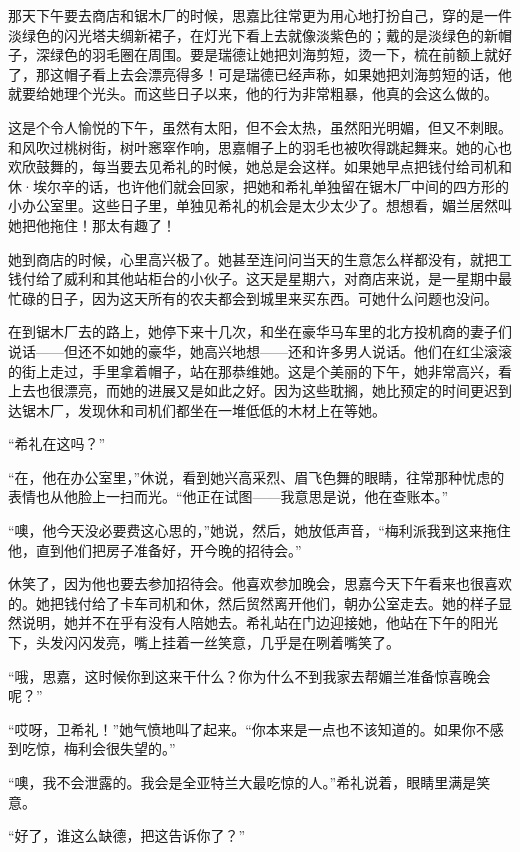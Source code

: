 \par 那天下午要去商店和锯木厂的时候，思嘉比往常更为用心地打扮自己，穿的是一件淡绿色的闪光塔夫绸新裙子，在灯光下看上去就像淡紫色的；戴的是淡绿色的新帽子，深绿色的羽毛圈在周围。要是瑞德让她把刘海剪短，烫一下，梳在前额上就好了，那这帽子看上去会漂亮得多！可是瑞德已经声称，如果她把刘海剪短的话，他就要给她理个光头。而这些日子以来，他的行为非常粗暴，他真的会这么做的。
\par 这是个令人愉悦的下午，虽然有太阳，但不会太热，虽然阳光明媚，但又不刺眼。和风吹过桃树街，树叶窸窣作响，思嘉帽子上的羽毛也被吹得跳起舞来。她的心也欢欣鼓舞的，每当要去见希礼的时候，她总是会这样。如果她早点把钱付给司机和休·埃尔辛的话，也许他们就会回家，把她和希礼单独留在锯木厂中间的四方形的小办公室里。这些日子里，单独见希礼的机会是太少太少了。想想看，媚兰居然叫她把他拖住！那太有趣了！
\par 她到商店的时候，心里高兴极了。她甚至连问问当天的生意怎么样都没有，就把工钱付给了威利和其他站柜台的小伙子。这天是星期六，对商店来说，是一星期中最忙碌的日子，因为这天所有的农夫都会到城里来买东西。可她什么问题也没问。
\par 在到锯木厂去的路上，她停下来十几次，和坐在豪华马车里的北方投机商的妻子们说话——但还不如她的豪华，她高兴地想——还和许多男人说话。他们在红尘滚滚的街上走过，手里拿着帽子，站在那恭维她。这是个美丽的下午，她非常高兴，看上去也很漂亮，而她的进展又是如此之好。因为这些耽搁，她比预定的时间更迟到达锯木厂，发现休和司机们都坐在一堆低低的木材上在等她。
\par “希礼在这吗？”
\par “在，他在办公室里，”休说，看到她兴高采烈、眉飞色舞的眼睛，往常那种忧虑的表情也从他脸上一扫而光。“他正在试图——我意思是说，他在查账本。”
\par “噢，他今天没必要费这心思的，”她说，然后，她放低声音，“梅利派我到这来拖住他，直到他们把房子准备好，开今晚的招待会。”
\par 休笑了，因为他也要去参加招待会。他喜欢参加晚会，思嘉今天下午看来也很喜欢的。她把钱付给了卡车司机和休，然后贸然离开他们，朝办公室走去。她的样子显然说明，她并不在乎有没有人陪她去。希礼站在门边迎接她，他站在下午的阳光下，头发闪闪发亮，嘴上挂着一丝笑意，几乎是在咧着嘴笑了。
\par “哦，思嘉，这时候你到这来干什么？你为什么不到我家去帮媚兰准备惊喜晚会呢？”
\par “哎呀，卫希礼！”她气愤地叫了起来。“你本来是一点也不该知道的。如果你不感到吃惊，梅利会很失望的。”
\par “噢，我不会泄露的。我会是全亚特兰大最吃惊的人。”希礼说着，眼睛里满是笑意。
\par “好了，谁这么缺德，把这告诉你了？”
